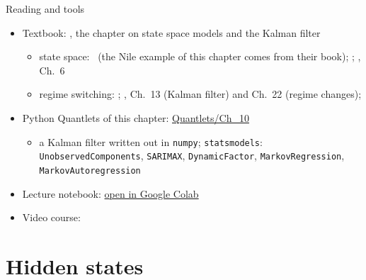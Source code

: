 \begin{frame}{Reading and tools}
\itemsize{\small}
\begin{itemize}
    \item Textbook: , the chapter on state space models and the Kalman filter
    \begin{itemize}
        \item state space: \ (the Nile example of this chapter comes from their book); ; , Ch.~6
        \item regime switching: ; , Ch.~13 (Kalman filter) and Ch.~22 (regime changes); 
    \end{itemize}
    \item Python Quantlets of this chapter: \href{https://github.com/danpele/Time-Series-Analysis/tree/main/Quantlets/Ch_10}{Quantlets/Ch\_10}
    \begin{itemize}
        \item a Kalman filter written out in \texttt{numpy}; \texttt{statsmodels}: \texttt{UnobservedComponents}, \texttt{SARIMAX}, \texttt{DynamicFactor}, \texttt{MarkovRegression}, \texttt{MarkovAutoregression}
    \end{itemize}
    \item Lecture notebook: \href{\colaburl{notebooks/EN/chapter10_lecture_notebook.ipynb}}{open in Google Colab}
    \item Video course: 
\end{itemize}
\end{frame}


\section{Hidden states}

